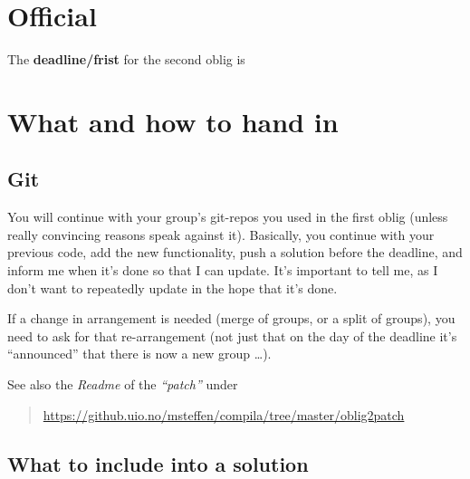 \documentclass[11pt,freeform]{handout}[2014/08/13]
\begin{document}
\thispagestyle{empty}



\section{Official }
\label{sec:official-info}




\hrulefill{}

The \textbf{deadline/frist}  for the second oblig is

\begin{quote}
  \textbf{\deadlinetwo}
\end{quote}





\section{What and how to hand in}
\label{sec:what-how}


\subsection{Git}
\label{sec:git}

You will continue with your group's git-repos you used in the first oblig
(unless really convincing reasons speak against it).  Basically, you
continue with your previous code, add the new functionality, push a
solution before the deadline, and inform me when it's done so that I can
update. It's important to tell me, as I don't want to repeatedly update in
the hope that it's done.


If a change in arrangement is needed (merge of groups, or a split of
groups), you need to ask for that re-arrangement (not just that on the day
of the deadline it's ``announced'' that there is now a new group \ldots).



See also the \emph{Readme} of the \emph{``patch''} under

\begin{quote}
  \url{https://github.uio.no/msteffen/compila/tree/master/oblig2patch}
\end{quote}


\subsection{What to include into a solution}
\label{sec:what-include-into}
\end{document}
